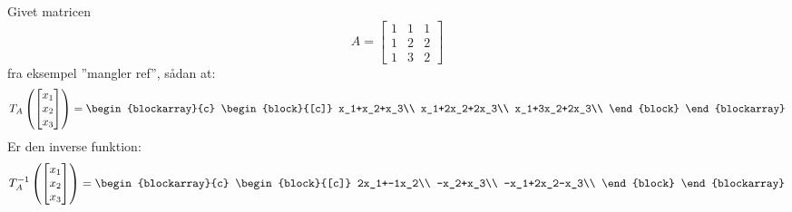 \begin{eks}
Givet matricen 
\begin{equation*}
A=
\begin{bmatrix}
1 & 1 & 1\\
1 & 2 & 2\\
1 & 3 & 2
\end{bmatrix}
\end{equation*}  fra eksempel ''mangler ref'', sådan at:
\begin{equation*}
T_A
\left(
\begin{bmatrix}
x_1\\
x_2\\
x_3
\end{bmatrix}
\right)
=
\begin{blockarray}{c}
\begin{block}{[c]}
x_1+x_2+x_3\\
x_1+2x_2+2x_3\\
x_1+3x_2+2x_3\\
\end{block}
\end{blockarray}
\end{equation*}
Er den inverse funktion:
\begin{equation*}
T_{A}^{-1}\left(
\begin{bmatrix}
x_1\\
x_2\\
x_3
\end{bmatrix}
\right)=
\begin{blockarray}{c}
\begin{block}{[c]}
2x_1+-1x_2\\
-x_2+x_3\\
-x_1+2x_2-x_3\\
\end{block}
\end{blockarray}
\end{equation*}
\end{eks}